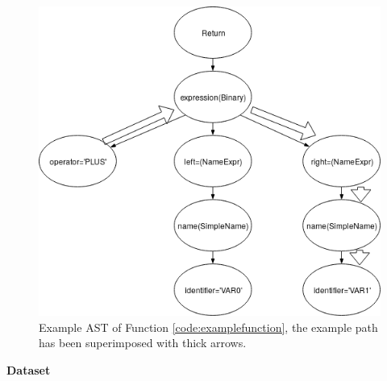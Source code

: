\documentclass{tudelftposter}
\begin{document}

\label{code:examplefunction}
\begin{figure}[H]
    \centering
    \includegraphics[width=0.4\linewidth]{img/Embedding.png}
    \caption{Example AST of Function \ref{code:examplefunction}, the example path has been superimposed with thick arrows.}
    \label{fig:exampleAST}
\end{figure}
\textbf{Dataset}
\begin{table}[H]
    \centering
    \caption{Statistics for code-snipets in DeepComm dataset}
    \label{tab:dataset-statistics}
\end{table}{}
\end{document}
